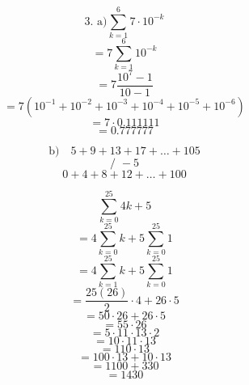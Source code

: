 \documentclass{article}
\begin{document}
\[ \text{3. a)} \sum_{k=1}^{6} 7 \cdot 10^{-k} \]
\[ = 7 \sum_{k=1}^{6} 10^{-k} \]
\[ = 7 \frac{10^7 - 1}{10 - 1} \]
\[ = 7 (10^{-1} + 10^{-2} + 10^{-3} + 10^{-4} + 10^{-5} + 10^{-6}) \]
\[ = 7 \cdot 0.111111 \]
\[ = 0.777777 \]

\[ \text{b)} \quad 5 + 9 + 13 + 17 + \dots + 105 \]
\[ \text{/ } -5 \]
\[ 0 + 4 + 8 + 12 + \dots + 100 \]

\[ \sum_{k=0}^{25} 4k+5 \]
\[ = 4 \sum_{k=0}^{25} k + 5 \sum_{k=0}^{25} 1 \]
\[ = 4 \sum_{k=1}^{25} k + 5 \sum_{k=0}^{25} 1 \]
\[ = \frac{25(26)}{2} \cdot 4 + 26 \cdot 5 \]
\[ = 50 \cdot 26 + 26 \cdot 5 \]
\[ = 55 \cdot 26 \]
\[ = 5 \cdot 11 \cdot 13 \cdot 2 \]
\[ = 10 \cdot 11 \cdot 13 \]
\[ = 110 \cdot 13 \]
\[ = 100 \cdot 13 + 10 \cdot 13\]
\[ = 1100 + 330 \]
\[ = 1430 \]
\end{document}
